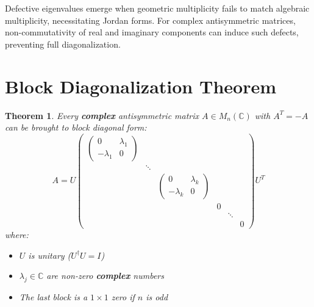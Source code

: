 \documentclass[aps,preprint]{revtex4}
\newtheorem{theorem}{Theorem}
\begin{document}
Defective eigenvalues emerge when geometric multiplicity fails to match
algebraic multiplicity, necessitating Jordan forms. For complex
antisymmetric matrices, non-commutativity of real and imaginary components
can induce such defects, preventing full diagonalization.

\section{Block Diagonalization Theorem}

\begin{theorem}
Every \textbf{complex} antisymmetric matrix $A\in M_{n}(\mathbb{C})$ with $%
A^{T}=-A$ can be brought to block diagonal form: 
\begin{equation}
A=U%
\begin{pmatrix}
\begin{pmatrix}
0 & \lambda _{1} \\ 
-\lambda _{1} & 0%
\end{pmatrix}
&  &  &  &  &  \\ 
& \ddots  &  &  &  &  \\ 
&  & 
\begin{pmatrix}
0 & \lambda _{k} \\ 
-\lambda _{k} & 0%
\end{pmatrix}
&  &  &  \\ 
&  &  & 0 &  &  \\ 
&  &  &  & \ddots  &  \\ 
&  &  &  &  & 0%
\end{pmatrix}%
U^{T}
\end{equation}%
where:

\begin{itemize}
\item $U$ is unitary ($U^\dagger U = I$)

\item $\lambda _{j}\in \mathbb{C}$ are non-zero \textbf{complex} numbers

\item The last block is a $1 \times 1$ zero if $n$ is odd
\end{itemize}
\end{theorem}
\end{document}
